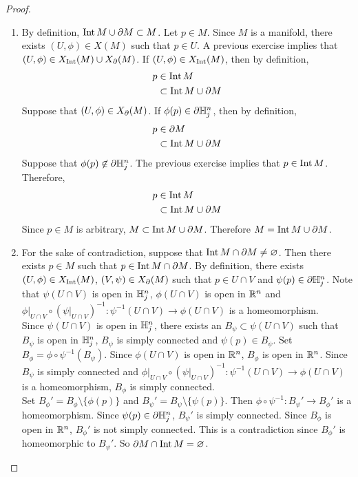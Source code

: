 \documentclass{book}
\begin{document}
	\begin{proof}\
		\begin{enumerate}
			\item By definition, $\operatorname{Int} M \cup \partial M \subset M$. Let $p \in M$. Since $M$ is a manifold, there exists $(U, \phi) \in X(M)$ such that $p \in U$. A previous exercise implies that $(U, \phi) \in X_{\operatorname{Int}}(M) \cup X_{\partial}(M)$. If $(U, \phi) \in X_{\operatorname{Int}}(M)$, then by definition, 
			\begin{align*}
				p 
				& \in \operatorname{Int} M \\
				& \subset \operatorname{Int} M \cup \partial M
			\end{align*}        
			Suppose that $(U, \phi) \in X_{\partial}(M)$. If $\phi(p) \in \partial \mathbb{H}^n_j $, then by definition, 
			\begin{align*}
				p 
				& \in \partial M \\
				& \subset \operatorname{Int} M \cup \partial M
			\end{align*}   
			Suppose that $\phi(p) \not \in \partial \mathbb{H}^n_j $. The previous exercise implies that $p \in \operatorname{Int} M$. Therefore, 
			\begin{align*}
				p 
				& \in \operatorname{Int} M \\
				& \subset \operatorname{Int} M \cup \partial M
			\end{align*}        
			Since $p \in M$ is arbitrary, $M \subset \operatorname{Int} M \cup \partial M$. Therefore $M = \operatorname{Int} M \cup \partial M$.
			\item For the sake of contradiction, suppose that $\operatorname{Int} M \cap \partial M \neq \varnothing$. Then there exists $p \in M$ such that $p \in \operatorname{Int} M \cap \partial M$. By definition, there exists $(U, \phi) \in X_{\operatorname{Int}}(M)$, $(V, \psi) \in X_{\partial}(M)$ such that $p \in U \cap V$ and $\psi(p) \in \partial \mathbb{H}^n_j $. Note that $\psi(U \cap V)$ is open in $\mathbb{H}^n_j $, $\phi(U \cap V)$ is open in $\mathbb{R}^n$ and $\phi|_{U \cap V} \circ (\psi|_{U \cap V})^{-1}: \psi^{-1}(U \cap V) \rightarrow \phi(U \cap V)$ is a homeomorphism.\\ 
			Since $\psi(U \cap V)$ is open in $\mathbb{H}^n_j $, there exists an $B_{\psi} \subset \psi(U \cap V)$ such that $B_{\psi}$ is open in $\mathbb{H}^n_j $, $B_{\psi}$ is simply connected and $\psi(p) \in B_{\psi}$. Set $B_{\phi} = \phi \circ \psi^{-1}(B_{\psi})$. Since $\phi(U \cap V)$ is open in $\mathbb{R}^n$, $B_{\phi}$ is open in $\mathbb{R}^n$. Since $B_{\psi}$ is simply connected and $\phi|_{U \cap V} \circ (\psi|_{U \cap V})^{-1}: \psi^{-1}(U \cap V) \rightarrow \phi(U \cap V)$ is a homeomorphism, $B_{\phi}$ is simply connected. \\
			Set $B_{\phi}' = B_{\phi} \setminus \{\phi(p)\}$ and $B_{\psi}' = B_{\psi} \setminus \{\psi(p)\}$. Then $\phi \circ \psi^{-1}: B_{\psi}' \rightarrow B_{\phi}'$ is a homeomorphism. Since $\psi(p) \in \partial \mathbb{H}^n_j $, $B_{\psi}'$ is simply connected. Since $B_{\phi}$ is open in $\mathbb{R}^n$, $B_{\phi}'$ is not simply connected. This is a contradiction since $B_{\phi}'$ is homeomorphic to $B_{\psi}'$. So $\partial M \cap \operatorname{Int} M = \varnothing$. 
		\end{enumerate}
	\end{proof}
\end{document}
